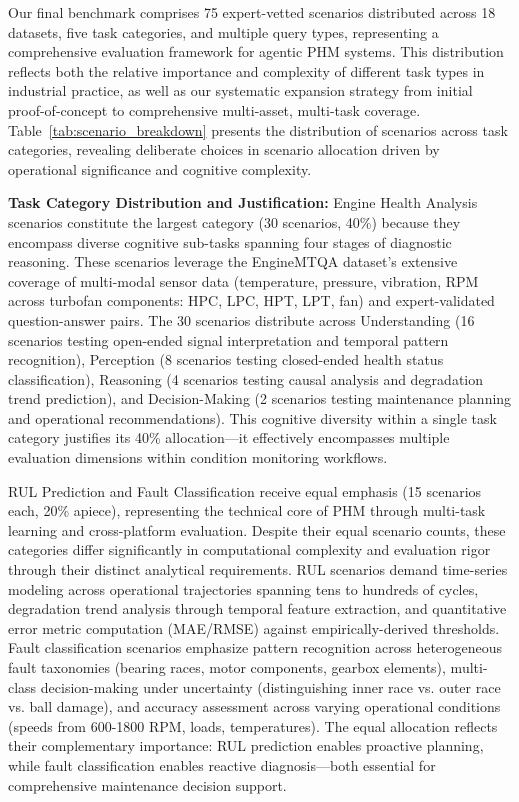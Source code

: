 \documentclass[sigconf]{acmart}
\begin{document}
Our final benchmark comprises 75 expert-vetted scenarios distributed across 18 datasets, five task categories, and multiple query types, representing a comprehensive evaluation framework for agentic PHM systems. This distribution reflects both the relative importance and complexity of different task types in industrial practice, as well as our systematic expansion strategy from initial proof-of-concept to comprehensive multi-asset, multi-task coverage. Table~\ref{tab:scenario_breakdown} presents the distribution of scenarios across task categories, revealing deliberate choices in scenario allocation driven by operational significance and cognitive complexity.

\textbf{Task Category Distribution and Justification:} Engine Health Analysis scenarios constitute the largest category (30 scenarios, 40\%) because they encompass diverse cognitive sub-tasks spanning four stages of diagnostic reasoning. These scenarios leverage the EngineMTQA dataset's extensive coverage of multi-modal sensor data (temperature, pressure, vibration, RPM across turbofan components: HPC, LPC, HPT, LPT, fan) and expert-validated question-answer pairs. The 30 scenarios distribute across Understanding (16 scenarios testing open-ended signal interpretation and temporal pattern recognition), Perception (8 scenarios testing closed-ended health status classification), Reasoning (4 scenarios testing causal analysis and degradation trend prediction), and Decision-Making (2 scenarios testing maintenance planning and operational recommendations). This cognitive diversity within a single task category justifies its 40\% allocation---it effectively encompasses multiple evaluation dimensions within condition monitoring workflows.

RUL Prediction and Fault Classification receive equal emphasis (15 scenarios each, 20\% apiece), representing the technical core of PHM through multi-task learning and cross-platform evaluation. Despite their equal scenario counts, these categories differ significantly in computational complexity and evaluation rigor through their distinct analytical requirements. RUL scenarios demand time-series modeling across operational trajectories spanning tens to hundreds of cycles, degradation trend analysis through temporal feature extraction, and quantitative error metric computation (MAE/RMSE) against empirically-derived thresholds. Fault classification scenarios emphasize pattern recognition across heterogeneous fault taxonomies (bearing races, motor components, gearbox elements), multi-class decision-making under uncertainty (distinguishing inner race vs. outer race vs. ball damage), and accuracy assessment across varying operational conditions (speeds from 600-1800 RPM, loads, temperatures). The equal allocation reflects their complementary importance: RUL prediction enables proactive planning, while fault classification enables reactive diagnosis---both essential for comprehensive maintenance decision support.
\end{document}
